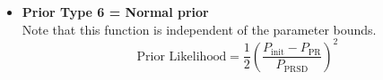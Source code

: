 \begin{itemize}
	\item \textbf{Prior Type 6 = Normal prior} \\ 
	Note that this function is independent of the parameter bounds.
	\begin{equation}
		\text{Prior Likelihood} = \frac{1}{2} \left(\frac{P_\text{init} - P_\text{PR}}{P_\text{PRSD}}\right)^2
	\end{equation}
\end{itemize}






\pagebreak